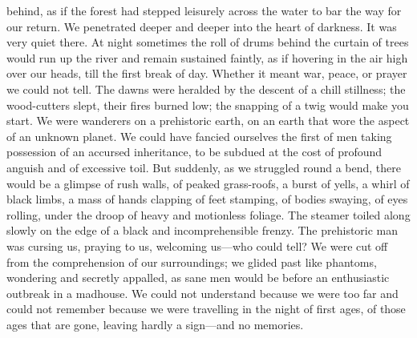 \documentclass[12pt]{report}
\begin{document}
behind, as if the forest had stepped leisurely across the water to bar
the way for our return. We penetrated deeper and deeper into the heart
of darkness. It was very quiet there. At night sometimes the roll of
drums behind the curtain of trees would run up the river and remain
sustained faintly, as if hovering in the air high over our heads, till
the first break of day. Whether it meant war, peace, or prayer we could
not tell. The dawns were heralded by the descent of a chill stillness;
the wood-cutters slept, their fires burned low; the snapping of a twig
would make you start. We were wanderers on a prehistoric earth, on an
earth that wore the aspect of an unknown planet. We could have fancied
ourselves the first of men taking possession of an accursed inheritance,
to be subdued at the cost of profound anguish and of excessive toil. But
suddenly, as we struggled round a bend, there would be a glimpse of rush
walls, of peaked grass-roofs, a burst of yells, a whirl of black limbs,
a mass of hands clapping of feet stamping, of bodies swaying, of eyes
rolling, under the droop of heavy and motionless foliage. The steamer
toiled along slowly on the edge of a black and incomprehensible frenzy.
The prehistoric man was cursing us, praying to us, welcoming us---who
could tell? We were cut off from the comprehension of our surroundings;
we glided past like phantoms, wondering and secretly appalled, as sane
men would be before an enthusiastic outbreak in a madhouse. We could not
understand because we were too far and could not remember because we
were travelling in the night of first ages, of those ages that are gone,
leaving hardly a sign---and no memories.
\end{document}
